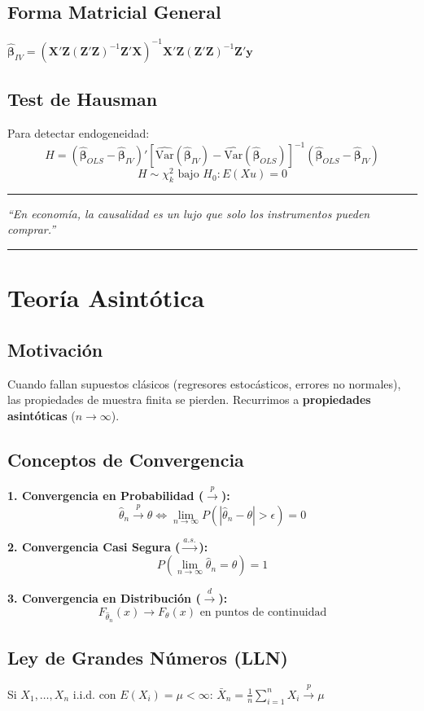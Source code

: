 \documentclass[9pt, spanish, twoside]{article}
\newcommand{\vogueQuote}[1]{
    \begin{center}
        \vspace{6pt}
        {\color{Champagne}\hrule height 0.2pt}
        \vspace{5pt}
        {\fontsize{11}{14} \selectfont \itshape \color{VogueBlack} ``#1''}
        \vspace{5pt}
        {\color{Champagne}\hrule height 0.2pt}
        \vspace{6pt}
    \end{center}
}
\newcommand{\eqbox}[1]{\colorbox{TitaniumGray}{$\displaystyle #1$}}
\begin{document}
\begin{multicols*}{3}
\subsection{Forma Matricial General}
\eqbox{\hat{\boldsymbol{\beta}}_{IV} = (\mathbf{X}'\mathbf{Z}(\mathbf{Z}'\mathbf{Z})^{-1}\mathbf{Z}'\mathbf{X})^{-1}\mathbf{X}'\mathbf{Z}(\mathbf{Z}'\mathbf{Z})^{-1}\mathbf{Z}'\mathbf{y}}

\subsection{Test de Hausman}
Para detectar endogeneidad:
$$H = (\hat{\boldsymbol{\beta}}_{OLS} - \hat{\boldsymbol{\beta}}_{IV})'\left[\widehat{\text{Var}}(\hat{\boldsymbol{\beta}}_{IV}) - \widehat{\text{Var}}(\hat{\boldsymbol{\beta}}_{OLS})\right]^{-1}(\hat{\boldsymbol{\beta}}_{OLS} - \hat{\boldsymbol{\beta}}_{IV})$$
$$H \sim \chi^2_k \text{ bajo } H_0: E(Xu) = 0$$

\vogueQuote{En economía, la causalidad es un lujo que solo los instrumentos pueden comprar.}

\section{Teoría Asintótica}
\subsection{Motivación}
Cuando fallan supuestos clásicos (regresores estocásticos, errores no normales), las propiedades de muestra finita se pierden. Recurrimos a \textbf{propiedades asintóticas} ($n \to \infty$).

\subsection{Conceptos de Convergencia}
\textbf{1. Convergencia en Probabilidad ($\xrightarrow{p}$):}
$$\hat{\theta}_n \xrightarrow{p} \theta \iff \lim_{n\to\infty} P(|\hat{\theta}_n - \theta| > \epsilon) = 0$$

\textbf{2. Convergencia Casi Segura ($\xrightarrow{a.s.}$):}
$$P\left(\lim_{n\to\infty}\hat{\theta}_n = \theta\right) = 1$$

\textbf{3. Convergencia en Distribución ($\xrightarrow{d}$):}
$$F_{\hat{\theta}_n}(x) \to F_\theta(x) \text{ en puntos de continuidad}$$

\subsection{Ley de Grandes Números (LLN)}
Si $X_1, \ldots, X_n$ i.i.d. con $E(X_i) = \mu < \infty$:
\eqbox{\bar{X}_n = \frac{1}{n}\sum_{i=1}^n X_i \xrightarrow{p} \mu}


\end{multicols*}
\end{document}
